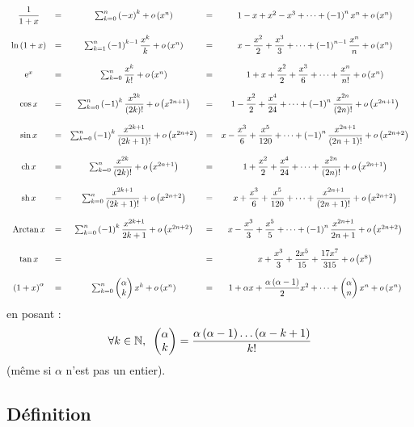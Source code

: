 \[\begin{array}{ccccc}
\dfrac{1}{1+x}&=&\sum_{k=0}^n\left(-x\right)^k+o\left(x^n\right)&=&1-x+x^2-x^3+\dots+\left(-1\right)^nx^n+o\left(x^n\right) \\\\
\ln\left(1+x\right)&=&\sum_{k=1}^n\left(-1\right)^{k-1}\dfrac{x^k}{k}+o\left(x^n\right)&=&x-\dfrac{x^2}{2}+\dfrac{x^3}{3}+\dots+\left(-1\right)^{n-1}\dfrac{x^n}{n}+o\left(x^n\right) \\\\
\mathrm{e}^{x}&=&\sum_{k=0}^n\dfrac{x^k}{k!}+o\left(x^n\right)&=&1+x+\dfrac{x^2}{2}+\dfrac{x^3}{6}+\dots+\dfrac{x^n}{n!}+o\left(x^n\right) \\\\
\cos x&=&\sum_{k=0}^n\left(-1\right)^k\dfrac{x^{2k}}{\left(2k\right)!}+o\left(x^{2n+1}\right)&=&1-\dfrac{x^2}{2}+\dfrac{x^4}{24}+\dots+\left(-1\right)^n\dfrac{x^{2n}}{\left(2n\right)!}+o\left(x^{2n+1}\right) \\\\
\sin x&=&\sum_{k=0}^n\left(-1\right)^k\dfrac{x^{2k+1}}{\left(2k+1\right)!}+o\left(x^{2n+2}\right)&=&x-\dfrac{x^3}{6}+\dfrac{x^5}{120}+\dots+\left(-1\right)^n\dfrac{x^{2n+1}}{\left(2n+1\right)!}+o\left(x^{2n+2}\right) \\\\
\operatorname{ch} x&=&\sum_{k=0}^n\dfrac{x^{2k}}{\left(2k\right)!}+o\left(x^{2n+1}\right)&=&1+\dfrac{x^2}{2}+\dfrac{x^4}{24}+\dots+\dfrac{x^{2n}}{\left(2n\right)!}+o\left(x^{2n+1}\right) \\\\
\operatorname{sh} x&=&\sum_{k=0}^n\dfrac{x^{2k+1}}{\left(2k+1\right)!}+o\left(x^{2n+2}\right)&=&x+\dfrac{x^3}{6}+\dfrac{x^5}{120}+\dots+\dfrac{x^{2n+1}}{\left(2n+1\right)!}+o\left(x^{2n+2}\right) \\\\
\operatorname{Arctan} x&=&\sum_{k=0}^n\left(-1\right)^k\dfrac{x^{2k+1}}{2k+1}+o\left(x^{2n+2}\right)&=&x-\dfrac{x^3}{3}+\dfrac{x^5}{5}+\dots+\left(-1\right)^n\dfrac{x^{2n+1}}{2n+1}+o\left(x^{2n+2}\right) \\\\
\tan x&=&&=&x+\dfrac{x^3}{3}+\dfrac{2x^5}{15}+\dfrac{17x^7}{315}+o\left(x^8\right) \\\\
\left(1+x\right)^\alpha&=&\sum_{k=0}^n\begin{pmatrix}\alpha\\k\end{pmatrix}x^k+o\left(x^n\right)&=&1+\alpha x+\dfrac{\alpha\left(\alpha-1\right)}{2}x^2+\dots+\begin{pmatrix}\alpha\\n\end{pmatrix}x^n+o\left(x^n\right)
\end{array}\] en posant : \[\quantifs{\forall k\in\N}\binom{k}{\alpha}=\dfrac{\alpha\paren{\alpha-1}\dots\paren{\alpha-k+1}}{k!}\] (même si \(\alpha\) n'est pas un entier).

\subsection{Définition}

